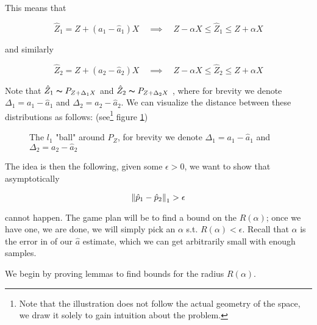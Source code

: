 This means that 

$$
    \hat{Z}_1 = Z + (a_1 - \hat{a}_1)X \quad \implies \quad Z - \alpha X \leq \hat{Z}_1 \leq Z + \alpha X 
$$

and similarly

$$
    \hat{Z}_2 = Z + (a_2 - \hat{a}_2)X \quad \implies \quad Z - \alpha X \leq \hat{Z}_2 \leq Z + \alpha X 
$$

Note that $\hat{Z}_1 \thicksim P_{Z + \Delta_1 X}$ and $\hat{Z}_2 \thicksim P_{Z + \Delta_2 X}$ , where for 
brevity we denote $\Delta_1 = a_1 - \hat{a}_1$ and $\Delta_2 = a_2 - \hat{a}_2$. We can visualize the distance
between these distributions as follows: (see\footnote{Note that the illustration does not follow the actual
geometry of the space, we draw it solely to gain intuition about the problem.} figure \ref{fig:dist})

\begin{figure}[!h]
    \centering
      \caption{The $l_1$ "ball" around $P_Z$, for brevity we denote 
      $\Delta_1 = a_1 - \hat{a}_1$ and $\Delta_2 = a_2 - \hat{a}_2$}
      \label{fig:dist}
\end{figure}

The idea is then the following, given some $\epsilon > 0$, we want to show that asymptotically

$$
    \left\lVert\hat{p}_1 - \hat{p}_2\right\rVert_1 > \epsilon
$$

cannot happen. The game plan will be to find a bound on the $R(\alpha)$; once we have one, we are done, we 
will simply pick an $\alpha$ s.t. $R(\alpha) < \epsilon$. Recall that $\alpha$ is the error in of our $\hat{a}$
estimate, which we can get arbitrarily small with enough samples. 

We begin by proving lemmas to find bounds for the radius $R(\alpha)$.


